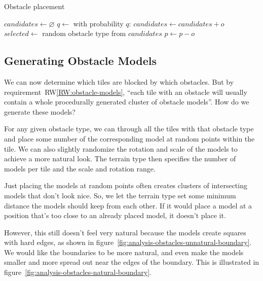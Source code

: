 \begin{algorithm}[H]
    \caption{Obstacle placement}
    \label{alg:obstacle-placement}
    \begin{algorithmic}[1]
        \Statex
        \State $candidates \gets \varnothing$
        \State $q \gets$ 
        \State with probability $q$: $candidates \gets candidates + o$
        \EndFor
        \Statex
        \State $selected \gets$ random obstacle type from $candidates$
        \State {}
        \EndIf
        \EndFor
        \Statex
        \State $p \gets p - o$
        \EndIf
        \EndFor
        \Statex
        \EndWhile
        \EndFor
        \Statex
    \end{algorithmic}
\end{algorithm}

\subsection{Generating Obstacle Models}\label{sec:analysis-obstacle-models}

We can now determine which tiles are blocked by which obstacles.
But by requirement~RW\ref{RW:obstacle-models}, \enquote{each tile with an obstacle will usually contain a whole procedurally generated cluster of obstacle models}.
How do we generate these models?

For any given obstacle type, we can through all the tiles with that obstacle type and place some number of the corresponding model at random points within the tile.
We can also slightly randomize the rotation and scale of the models to achieve a more natural look.
The terrain type then specifies the number of models per tile and the scale and rotation range.

Just placing the models at random points often creates clusters of intersecting models that don't look nice.
So, we let the terrain type set some minimum distance the models should keep from each other.
If it would place a model at a position that's too close to an already placed model, it doesn't place it.

However, this still doesn't feel very natural because the models create squares with hard edges, as shown in figure~\ref{fig:analysis-obstacles-unnatural-boundary}.
We would like the boundaries to be more natural, and even make the models smaller and more spread out near the edges of the boundary.
This is illustrated in figure~\ref{fig:analysis-obstacles-natural-boundary}.

